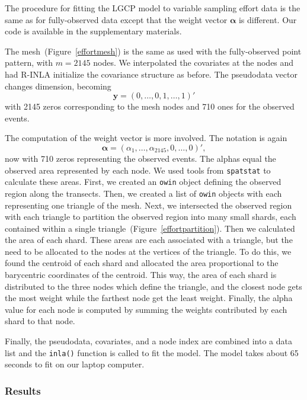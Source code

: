 \documentclass{interact}
\begin{document}
The procedure for fitting the LGCP model to variable sampling effort data is
the same as for fully-observed data except that the weight vector
\(\boldsymbol{\alpha}\) is different. Our code is available in the
supplementary materials.

The mesh~(Figure~\ref{effortmesh}) is the same as used with the fully-observed
point pattern, with \(m = 2145\) nodes. We interpolated the covariates
at the nodes and had R-INLA initialize the covariance structure as
before. The pseudodata vector changes dimension, becoming
\begin{equation}
\mathbf{y} = (0, \dots, 0, 1, \dots, 1)'
\end{equation}
with 2145 zeros corresponding to the mesh nodes and 710 ones for the observed
events.

The computation of the weight vector is more involved. The notation is again
\begin{equation}
\boldsymbol{\alpha} = (\alpha_{1}, \dots, \alpha_{2145}, 0, \dots, 0)',
\end{equation}
now with 710 zeros representing the observed events. The alphas equal the
observed area represented by each node. We used tools from \texttt{spatstat}
to calculate these areas. First, we created an \texttt{owin} object defining
the observed region along the transects. Then, we created a list of
\texttt{owin} objects with each representing one triangle of the mesh. Next,
we intersected the observed region with each triangle to partition the observed
region into many small shards, each contained within a single
triangle~(Figure~\ref{effortpartition}). Then we calculated the area of each
shard. These areas are each associated with a triangle, but the need to be
allocated to the nodes at the vertices of the triangle. To do this, we found
the centroid of each shard and allocated the area proportional to the
barycentric coordinates of the centroid. This way, the area of each shard is
distributed to the three nodes which define the triangle, and the closest node
gets the most weight while the farthest node get the least weight. Finally,
the alpha value for each node is computed by summing the weights contributed
by each shard to that node.

Finally, the pseudodata, covariates, and a node index are combined into a data
list and the \texttt{inla()} function is called to fit the model. The model
takes about 65 seconds to fit on our laptop computer.


\subsubsection{Results}
\label{xsectresults}
\end{document}
